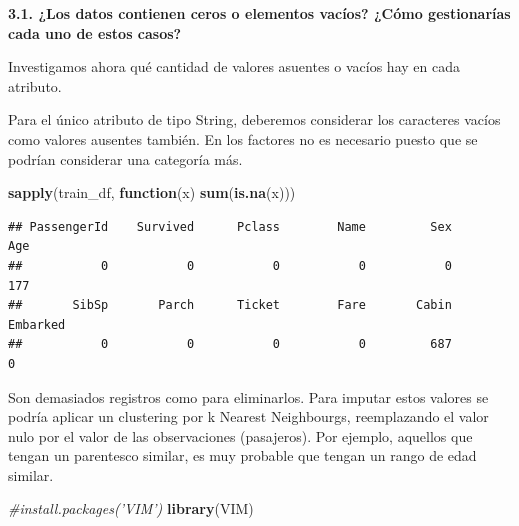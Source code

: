 \documentclass[]{article}
\newenvironment{Shaded}{\begin{snugshade}}{\end{snugshade}}
\newcommand{\CommentTok}[1]{\textcolor[rgb]{0.56,0.35,0.01}{\textit{#1}}}
\newcommand{\ControlFlowTok}[1]{\textcolor[rgb]{0.13,0.29,0.53}{\textbf{#1}}}
\newcommand{\KeywordTok}[1]{\textcolor[rgb]{0.13,0.29,0.53}{\textbf{#1}}}
\newcommand{\NormalTok}[1]{#1}
\newcommand{\OperatorTok}[1]{\textcolor[rgb]{0.81,0.36,0.00}{\textbf{#1}}}
\newcommand{\OtherTok}[1]{\textcolor[rgb]{0.56,0.35,0.01}{#1}}
\newcommand{\StringTok}[1]{\textcolor[rgb]{0.31,0.60,0.02}{#1}}
\begin{document}
\textbf{3.1. ¿Los datos contienen ceros o elementos vacíos? ¿Cómo
gestionarías cada uno de estos casos?}

Investigamos ahora qué cantidad de valores asuentes o vacíos hay en cada
atributo.

Para el único atributo de tipo String, deberemos considerar los
caracteres vacíos como valores ausentes también. En los factores no es
necesario puesto que se podrían considerar una categoría más.

\begin{Shaded}
\end{Shaded}

\begin{Shaded}
\begin{Highlighting}[]
\KeywordTok{sapply}\NormalTok{(train_df, }\ControlFlowTok{function}\NormalTok{(x) }\KeywordTok{sum}\NormalTok{(}\KeywordTok{is.na}\NormalTok{(x)))}
\end{Highlighting}
\end{Shaded}

\begin{verbatim}
## PassengerId    Survived      Pclass        Name         Sex         Age 
##           0           0           0           0           0         177 
##       SibSp       Parch      Ticket        Fare       Cabin    Embarked 
##           0           0           0           0         687           0
\end{verbatim}

Son demasiados registros como para eliminarlos. Para imputar estos
valores se podría aplicar un clustering por k Nearest Neighbourgs,
reemplazando el valor nulo por el valor de las observaciones
(pasajeros). Por ejemplo, aquellos que tengan un parentesco similar, es
muy probable que tengan un rango de edad similar.

\begin{Shaded}
\begin{Highlighting}[]
\CommentTok{#install.packages('VIM')}
\KeywordTok{library}\NormalTok{(VIM)}
\end{Highlighting}
\end{Shaded}
\end{document}
